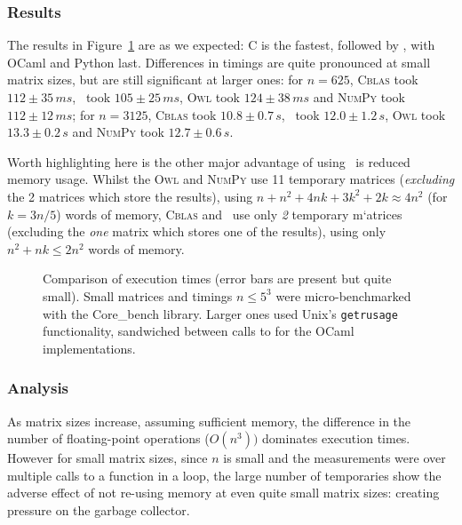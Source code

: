 \subsubsection{Results}


The results in Figure~\ref{fig:timings} are as we expected: C is the fastest,
followed by \lang, with OCaml and Python last.  Differences in timings are
quite pronounced at small matrix sizes, but are still significant at larger
ones: for $n=625$, \textsc{Cblas} took $112 \pm 35\, ms$, \lang\ took $105 \pm
25 \, ms$, \textsc{Owl} took $124 \pm 38\, ms$ and \textsc{NumPy} took $112
\pm 12\, ms$;  for $n=3125$, \textsc{Cblas} took $10.8 \pm 0.7\, s$, \lang\
took $12.0 \pm 1.2 \, s$, \textsc{Owl} took $13.3 \pm 0.2\, s$ and
\textsc{NumPy} took $12.7 \pm 0.6\, s$.

Worth highlighting here is the other major advantage of using \lang\ is reduced
memory usage.  Whilst the \textsc{Owl} and \textsc{NumPy} use 11 temporary
matrices (\emph{excluding} the 2 matrices which store the results), using $n +
n^2 + 4nk + 3k^2 + 2k \approx 4n^2$ (for $k = 3n/5$) words of memory,
\textsc{Cblas} and \lang\ use only \emph{2} temporary m`atrices (excluding the
\emph{one} matrix which stores one of the results), using only $n^2 + nk \leq
2n^2$ words of memory.

\begin{figure}[t]
    \centering
    
    \caption{Comparison of execution times (error bars are present but quite
        small). Small matrices and timings $n \le 5^3$ were micro-benchmarked
        with the Core\_bench library. Larger ones used Unix's
        \texttt{getrusage} functionality, sandwiched between calls to
        \highl{Gc.full_major} for the OCaml implementations.}\label{fig:timings}
\end{figure}

\subsubsection{Analysis}

As matrix sizes increase, assuming sufficient memory, the difference in the
number of floating-point operations ($O(n^3))$ dominates execution times.
However for small matrix sizes, since $n$ is small and the measurements were
over multiple calls to a function in a loop, the large number of temporaries
show the adverse effect of not re-using memory at even quite small matrix
sizes: creating pressure on the garbage collector.

